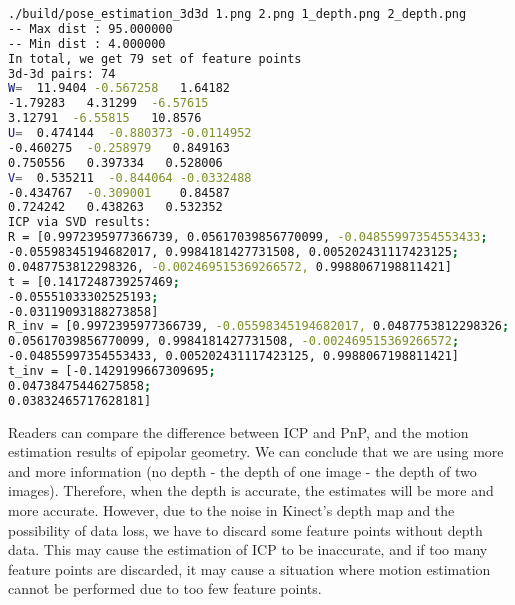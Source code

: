 \begin{lstlisting}[language=sh,caption=终端输入：]
./build/pose_estimation_3d3d 1.png 2.png 1_depth.png 2_depth.png
-- Max dist : 95.000000 
-- Min dist : 4.000000 
In total, we get 79 set of feature points
3d-3d pairs: 74
W=  11.9404 -0.567258   1.64182
-1.79283   4.31299  -6.57615
3.12791  -6.55815   10.8576
U=  0.474144  -0.880373 -0.0114952
-0.460275  -0.258979   0.849163
0.750556   0.397334   0.528006
V=  0.535211  -0.844064 -0.0332488
-0.434767  -0.309001    0.84587
0.724242   0.438263   0.532352
ICP via SVD results: 
R = [0.9972395977366739, 0.05617039856770099, -0.04855997354553433;
-0.05598345194682017, 0.9984181427731508, 0.005202431117423125;
0.0487753812298326, -0.002469515369266572, 0.9988067198811421]
t = [0.1417248739257469;
-0.05551033302525193;
-0.03119093188273858]
R_inv = [0.9972395977366739, -0.05598345194682017, 0.0487753812298326;
0.05617039856770099, 0.9984181427731508, -0.002469515369266572;
-0.04855997354553433, 0.005202431117423125, 0.9988067198811421]
t_inv = [-0.1429199667309695;
0.04738475446275858;
0.03832465717628181]
\end{lstlisting}

Readers can compare the difference between ICP and PnP, and the motion estimation results of epipolar geometry. We can conclude that we are using more and more information (no depth - the depth of one image - the depth of two images). Therefore, when the depth is accurate, the estimates will be more and more accurate. However, due to the noise in Kinect's depth map and the possibility of data loss, we have to discard some feature points without depth data. This may cause the estimation of ICP to be inaccurate, and if too many feature points are discarded, it may cause a situation where motion estimation cannot be performed due to too few feature points.

